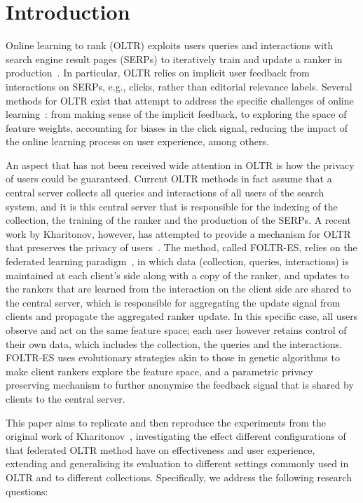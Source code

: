 \section{Introduction}

Online learning to rank (OLTR) exploits users queries and interactions with search engine result pages (SERPs) to iteratively train and update a ranker in  production~\cite{oosterhuis2018differentiable}. In particular, OLTR relies on implicit user feedback from interactions on SERPs, e.g., clicks, rather than editorial relevance labels. 
Several methods for OLTR exist that attempt to address the specific challenges of online learning~\cite{oosterhuis2018differentiable,joachims2017unbiased,zhuang2020counterfactual,jagerman2019model}: from making sense of the implicit feedback, to exploring the space of feature weights, accounting for biases in the click signal, reducing the impact of the online learning process on user experience, among others. 

An aspect that has not been received wide attention in OLTR is how the privacy of users could be guaranteed. Current OLTR methods in fact assume that a central server collects all queries and interactions of all users of the search system, and it is this central server that is responsible for the indexing of the collection, the training of the ranker and the production of the SERPs. A recent work by Kharitonov, however, has attempted to provide a mechanism for OLTR that preserves the privacy of users~\cite{kharitonov2019federated}. The method, called FOLTR-ES, relies on the federated learning paradigm~\cite{yang2019federated}, in which data (collection, queries, interactions) is maintained at each client's side along with a copy of the ranker, and updates to the rankers that are learned from the interaction on the client side are shared to the central server, which is responsible for aggregating the update signal from clients and propagate the aggregated ranker update. In this specific case, all users observe and act on the same feature space; each user however retains control of their own data, which includes the collection, the queries and the interactions. FOLTR-ES uses evolutionary strategies akin to those in genetic algorithms to make client rankers explore the feature space, and a parametric privacy preserving mechanism to further anonymise the feedback signal that is shared by clients to the central server.  


This paper aims to replicate and then reproduce the experiments from the original work of Kharitonov~\cite{kharitonov2019federated}, investigating the effect different configurations of that federated OLTR method have on effectiveness and user experience, extending and generalising its evaluation to different settings commonly used in OLTR and to different collections. Specifically, we address the following research questions:

